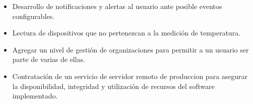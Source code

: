 \begin{itemize}
	\item Desarrollo de notificaciones y alertas al usuario ante posible eventos configurables.
	\item Lectura de dispositivos que no pertenezcan a la medición de temperatura.
	\item Agregar un nivel de gestión de organizaciones para permitir a un usuario ser parte de varias de ellas. 
	\item Contratación de un servicio de servidor remoto de produccion para asegurar la disponibilidad, integridad y utilización de recursos del software implementado.
\end{itemize}
